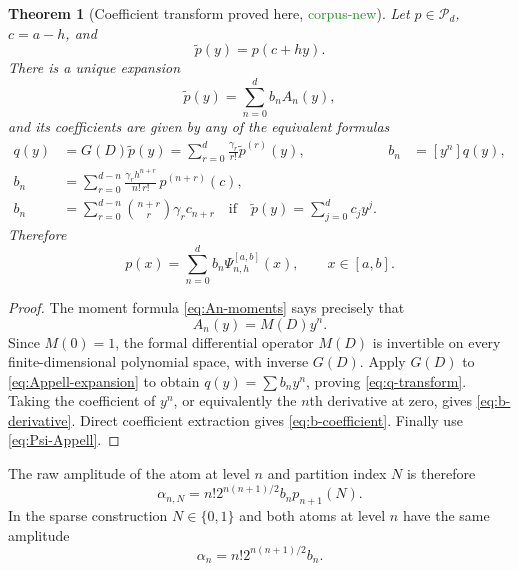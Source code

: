 \documentclass[11pt]{article}
\newtheorem{theorem}{Theorem}[section]
\theoremstyle{definition}
\theoremstyle{remark}
\newcommand{\Pp}{\mathcal{P}}
\newcommand{\1}{\mathbf{1}}
\newcommand{\CorpusNew}{\textcolor{ForestGreen}{\textsf{corpus-new}}}
\newcommand{\ProvedHere}{\textcolor{BrickRed}{\textsf{proved here}}}
\begin{document}
\begin{theorem}[Coefficient transform \ProvedHere, \CorpusNew]
\label{thm:coefficient-transform}
Let $p\in\Pp_d$, $c=a-h$, and
\begin{equation}
 \widetilde p(y)=p(c+hy).
 \label{eq:ptilde}
\end{equation}
There is a unique expansion
\begin{equation}
 \widetilde p(y)=\sum_{n=0}^{d}b_nA_n(y),
 \label{eq:Appell-expansion}
\end{equation}
and its coefficients are given by any of the equivalent formulas
\begin{align}
 q(y)&=G(D)\widetilde p(y)
 =\sum_{r=0}^{d}\frac{\gamma_r}{r!}\widetilde p^{(r)}(y),
 &b_n&=[y^n]q(y),\label{eq:q-transform}\\
 b_n&=\sum_{r=0}^{d-n}
 \frac{\gamma_r h^{n+r}}{n!\,r!}\,p^{(n+r)}(c),
 \label{eq:b-derivative}\\
 b_n&=\sum_{r=0}^{d-n}\binom{n+r}{r}\gamma_r c_{n+r}
 \quad\text{if}\quad
 \widetilde p(y)=\sum_{j=0}^{d}c_jy^j.
 \label{eq:b-coefficient}
\end{align}
Therefore
\begin{equation}
 p(x)=\sum_{n=0}^{d}b_n\Psi_{n,h}^{[a,b]}(x),
 \qquad x\in[a,b].
 \label{eq:p-Psi}
\end{equation}
\end{theorem}

\begin{proof}
The moment formula \eqref{eq:An-moments} says precisely that
\begin{equation}
 A_n(y)=M(D)y^n.
 \label{eq:MD}
\end{equation}
Since $M(0)=1$, the formal differential operator $M(D)$ is invertible on every
finite-dimensional polynomial space, with inverse $G(D)$.  Apply $G(D)$ to
\eqref{eq:Appell-expansion} to obtain
$q(y)=\sum b_ny^n$, proving \eqref{eq:q-transform}.  Taking the coefficient of
$y^n$, or equivalently the $n$th derivative at zero, gives
\eqref{eq:b-derivative}.  Direct coefficient extraction gives
\eqref{eq:b-coefficient}.  Finally use \eqref{eq:Psi-Appell}.
\end{proof}

The raw amplitude of the atom at level $n$ and partition index $N$ is therefore
\begin{equation}
 \alpha_{n,N}
 =n!2^{n(n+1)/2}b_n p_{n+1}(N).
 \label{eq:alpha-nN}
\end{equation}
In the sparse construction $N\in\{0,1\}$ and both atoms at level $n$ have the
same amplitude
\begin{equation}
 \alpha_n=n!2^{n(n+1)/2}b_n.
 \label{eq:alpha-n}
\end{equation}
\end{document}
